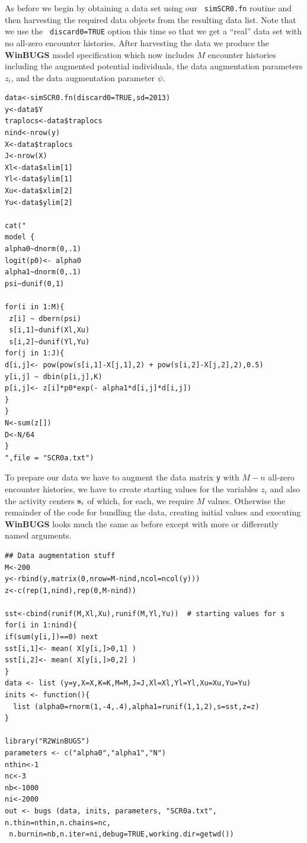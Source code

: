 As before we begin by obtaining a data set using our \mbox{\tt
  simSCR0.fn} routine and then harvesting the required data objects
from the resulting data list.  Note that we use the \mbox{\tt
  discard0=TRUE} option this time so that we get a ``real'' data set
with no all-zero encounter histories. After harvesting the data we
produce the {\bf WinBUGS} model specification which now includes $M$
encounter histories including the augmented potential individuals, the
data augmentation parameters $z_{i}$, and the data augmentation
parameter $\psi$.
{\small
\begin{verbatim}
data<-simSCR0.fn(discard0=TRUE,sd=2013)
y<-data$Y
traplocs<-data$traplocs
nind<-nrow(y)
X<-data$traplocs
J<-nrow(X)
Xl<-data$xlim[1]
Yl<-data$ylim[1]
Xu<-data$xlim[2]
Yu<-data$ylim[2]

cat("
model {
alpha0~dnorm(0,.1)
logit(p0)<- alpha0
alpha1~dnorm(0,.1)
psi~dunif(0,1)

for(i in 1:M){
 z[i] ~ dbern(psi)
 s[i,1]~dunif(Xl,Xu)
 s[i,2]~dunif(Yl,Yu)
for(j in 1:J){
d[i,j]<- pow(pow(s[i,1]-X[j,1],2) + pow(s[i,2]-X[j,2],2),0.5)
y[i,j] ~ dbin(p[i,j],K)
p[i,j]<- z[i]*p0*exp(- alpha1*d[i,j]*d[i,j])
}
}
N<-sum(z[])
D<-N/64
}
",file = "SCR0a.txt")
\end{verbatim}
}

To prepare our data we have to augment the data matrix \mbox{\tt y}
with $M-n$ all-zero encounter histories, we have to create starting
values for the variables $z_{i}$ and also the activity centers ${\bf
  s}_{i}$ of which, for each, we require $M$ values. Otherwise the
remainder of the code for bundling the data, creating initial values
and executing {\bf WinBUGS} looks much the same as before except with more
or differently named arguments.
{\small
\begin{verbatim}
## Data augmentation stuff
M<-200
y<-rbind(y,matrix(0,nrow=M-nind,ncol=ncol(y)))
z<-c(rep(1,nind),rep(0,M-nind))

sst<-cbind(runif(M,Xl,Xu),runif(M,Yl,Yu))  # starting values for s
for(i in 1:nind){
if(sum(y[i,])==0) next
sst[i,1]<- mean( X[y[i,]>0,1] )
sst[i,2]<- mean( X[y[i,]>0,2] )
}
data <- list (y=y,X=X,K=K,M=M,J=J,Xl=Xl,Yl=Yl,Xu=Xu,Yu=Yu)
inits <- function(){
  list (alpha0=rnorm(1,-4,.4),alpha1=runif(1,1,2),s=sst,z=z)
}

library("R2WinBUGS")
parameters <- c("alpha0","alpha1","N")
nthin<-1
nc<-3
nb<-1000
ni<-2000
out <- bugs (data, inits, parameters, "SCR0a.txt", n.thin=nthin,n.chains=nc,
 n.burnin=nb,n.iter=ni,debug=TRUE,working.dir=getwd())
\end{verbatim}
}

